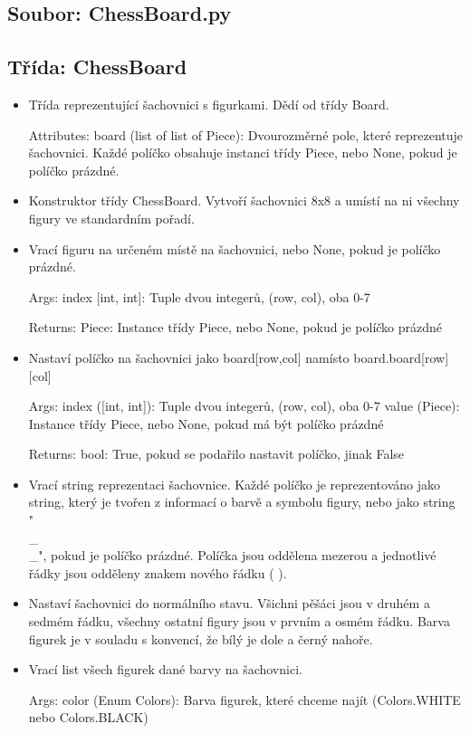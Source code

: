 \documentclass{article}
\begin{document}
\subsection*{Soubor: ChessBoard.py}
\begin{itemize}
 \subsection*{Třída: ChessBoard}
\begin{itemize}
\item{Třída reprezentující šachovnici s figurkami. Dědí od třídy Board. 

Attributes:
  board (list of list of Piece): Dvourozměrné pole, které reprezentuje šachovnici. Každé políčko obsahuje instanci třídy Piece, nebo None, pokud je políčko prázdné.}
\item{Konstruktor třídy ChessBoard. Vytvoří šachovnici 8x8 a umístí na ni všechny figury ve standardním pořadí.}
\item{Vrací figuru na určeném místě na šachovnici, nebo None, pokud je políčko prázdné. 

Args:
    index [int, int]: Tuple dvou integerů, (row, col), oba 0-7

Returns:
    Piece: Instance třídy Piece, nebo None, pokud je políčko prázdné}
\item{Nastaví políčko na šachovnici jako board[row,col] namísto board.board[row][col] 

Args:
    index ([int, int]): Tuple dvou integerů, (row, col), oba 0-7
    value (Piece): Instance třídy Piece, nebo None, pokud má být políčko prázdné
    
Returns:
    bool: True, pokud se podařilo nastavit políčko, jinak False}
\item{    Vrací string reprezentaci šachovnice. Každé políčko je reprezentováno jako string, který je tvořen z informací o barvě a symbolu figury, nebo jako string "\\_\\_", pokud je políčko prázdné. Políčka jsou oddělena mezerou a jednotlivé řádky jsou odděleny znakem nového řádku (
).
    }
\item{Nastaví šachovnici do normálního stavu. Všichni pěšáci jsou v druhém a sedmém řádku, všechny ostatní figury jsou v prvním a osmém řádku. Barva figurek je v souladu s konvencí, že bílý je dole a černý nahoře.}
\item{Vrací list všech figurek dané barvy na šachovnici.

Args:
    color (Enum Colors): Barva figurek, které chceme najít (Colors.WHITE nebo Colors.BLACK)
    
}
\end{itemize}
\end{itemize}
\end{document}

